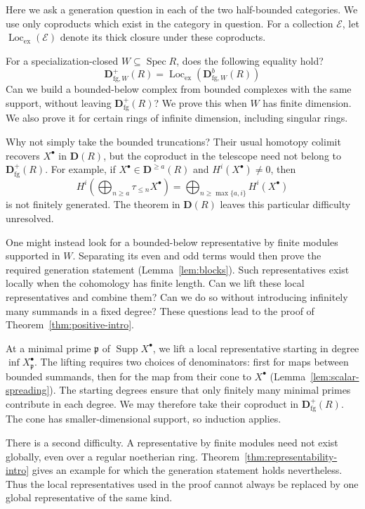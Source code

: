 \documentclass[11pt]{amsart}
\numberwithin{equation}{section}
\theoremstyle{definition}
\theoremstyle{remark}
\DeclareMathOperator{\Supp}{Supp}
\DeclareMathOperator{\Spec}{Spec}
\DeclareMathOperator{\Loc}{Loc}
\newcommand{\D}{\mathbf D}
\newcommand{\fg}{\mathrm{fg}}
\newcommand{\Lex}{\Loc_{\mathrm{ex}}}
\newcommand{\p}{\mathfrak p}
\begin{document}
Here we ask a generation question in each of the two half-bounded
categories. We use only coproducts which exist in the category in
question. For a collection $\mathcal E$, let $\Lex(\mathcal E)$
denote its thick closure under these coproducts.

For a
specialization-closed $W\subseteq\Spec R$, does the following
equality hold?
\[
 \D^+_{\fg,W}(R)=\Lex(\D^b_{\fg,W}(R))
\]
Can we build a bounded-below complex from bounded complexes
with the same support, without leaving $\D^+_{\fg}(R)$?
We prove this when $W$ has finite dimension. We also prove it for
certain rings of infinite dimension, including singular rings.

Why not simply take the bounded truncations? Their usual homotopy
colimit recovers $X^{\bullet}$ in $\D(R)$, but the coproduct in the
telescope need not belong to $\D^+_{\fg}(R)$. For example, if
$X^{\bullet}\in\D^{\geq a}(R)$ and $H^i(X^{\bullet})\ne0$, then
\[
 H^i\!\left(\bigoplus_{n\geq a}\tau_{\leq n}X^{\bullet}\right)
 =\bigoplus_{n\geq\max\{a,i\}}H^i(X^{\bullet})
\]
is not finitely generated. The theorem in $\D(R)$ leaves this
particular difficulty unresolved.

One might instead look for a bounded-below representative by finite
modules supported in $W$. Separating its even and odd terms would
then prove the required generation statement
(Lemma~\ref{lem:blocks}). Such representatives exist locally when
the cohomology has finite length. Can we lift these local
representatives and combine them? Can we do so without introducing
infinitely many summands in a fixed degree? These questions lead
to the proof of Theorem~\ref{thm:positive-intro}.

At a minimal prime $\p$ of $\Supp X^{\bullet}$, we lift a local
representative starting in degree $\inf X^{\bullet}_\p$.
The lifting requires two choices of denominators: first for maps
between bounded summands, then for the map from their cone to
$X^{\bullet}$ (Lemma~\ref{lem:scalar-spreading}). The starting
degrees ensure that only finitely many minimal primes contribute
in each degree. We may therefore take their coproduct in
$\D^+_{\fg}(R)$. The cone has smaller-dimensional support, so
induction applies.

There is a second difficulty. A representative by finite modules
need not exist globally, even over a regular noetherian ring.
Theorem~\ref{thm:representability-intro} gives an example for which
the generation statement holds nevertheless. Thus the local
representatives used in the proof cannot always be replaced by
one global representative of the same kind.
\end{document}
